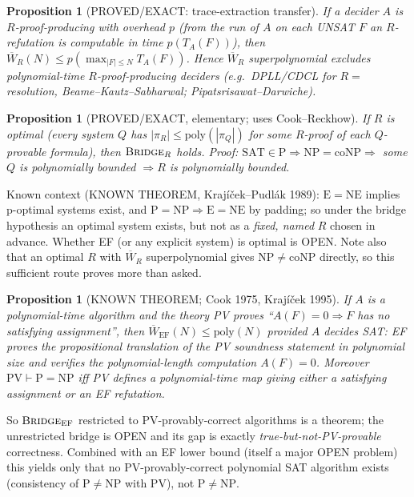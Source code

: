 \documentclass[11pt]{article}
\newtheorem{proposition}[theorem]{Proposition}
\theoremstyle{definition}\newtheorem{definition}[theorem]{Definition}
\theoremstyle{remark}\newtheorem{remark}[theorem]{Remark}
\begin{document}
\begin{proposition}[PROVED/EXACT: trace-extraction transfer]\label{p:trace}
If a decider $A$ is \emph{$R$-proof-producing with overhead $p$} (from the run of $A$ on each UNSAT $F$ an $R$-refutation is
computable in time $p(T_A(F))$), then $\overline W_R(N)\le p(\max_{|F|\le N}T_A(F))$. Hence $\overline W_R$ superpolynomial excludes
polynomial-time $R$-proof-producing deciders (e.g.\ DPLL/CDCL for $R=$ resolution, Beame--Kautz--Sabharwal; Pipatsrisawat--Darwiche).
\end{proposition}

\begin{proposition}[PROVED/EXACT, elementary; uses Cook--Reckhow]\label{p:opt}
If $R$ is \emph{optimal} (every system $Q$ has $|\pi_R|\le\mathrm{poly}(|\pi_Q|)$ for some $R$-proof of each $Q$-provable
formula), then $\textsc{Bridge}_R$ holds. Proof: $\mathrm{SAT}\in\mathrm P\Rightarrow\mathrm{NP}=\mathrm{coNP}\Rightarrow$ some $Q$ is
polynomially bounded $\Rightarrow R$ is polynomially bounded.
\end{proposition}
\noindent Known context (KNOWN THEOREM, Kraj\'i\v{c}ek--Pudl\'ak 1989): $\mathrm{E}=\mathrm{NE}$ implies p-optimal systems exist, and
$\mathrm{P}=\mathrm{NP}\Rightarrow \mathrm E=\mathrm{NE}$ by padding; so under the bridge hypothesis an optimal system exists, but
not as a \emph{fixed, named} $R$ chosen in advance. Whether EF (or any explicit system) is optimal is OPEN. Note also that an optimal $R$
with $\overline W_R$ superpolynomial gives $\mathrm{NP}\neq\mathrm{coNP}$ directly, so this sufficient route proves more than asked.

\begin{proposition}[KNOWN THEOREM; Cook 1975, Kraj\'i\v{c}ek 1995]\label{p:ef}
If $A$ is a polynomial-time algorithm and the theory PV proves ``$A(F)=0\Rightarrow F$ has no satisfying assignment'', then
$\overline W_{\mathrm{EF}}(N)\le\mathrm{poly}(N)$ provided $A$ decides SAT: EF proves the propositional translation of the PV soundness
statement in polynomial size and verifies the polynomial-length computation $A(F)=0$. Moreover $\mathrm{PV}\vdash\mathrm P=\mathrm{NP}$
iff PV defines a polynomial-time map giving either a satisfying assignment or an EF refutation.
\end{proposition}
\noindent So $\textsc{Bridge}_{\mathrm{EF}}$ restricted to PV-provably-correct algorithms is a theorem; the unrestricted bridge is OPEN
and its gap is exactly \emph{true-but-not-PV-provable} correctness. Combined with an EF lower bound (itself a major OPEN problem)
this yields only that no PV-provably-correct polynomial SAT algorithm exists (consistency of $\mathrm P\neq\mathrm{NP}$ with PV),
not $\mathrm P\neq\mathrm{NP}$.
\end{document}

